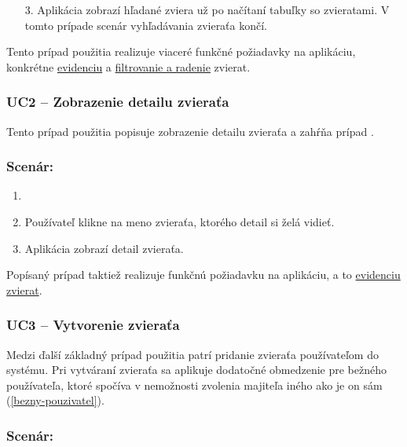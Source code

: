 \begin{enumerate}
    \item [3.] Aplikácia zobrazí hľadané zviera už po načítaní tabuľky so zvieratami. V tomto prípade scenár vyhľadávania zvieraťa končí.
\end{enumerate}

Tento prípad použitia realizuje viaceré funkčné požiadavky na aplikáciu, konkrétne \hyperref[evidencia-zvierat]{evidenciu} a \hyperref[filtrovanie-a-radenie]{filtrovanie a radenie} zvierat.

\subsubsection{UC2 -- Zobrazenie detailu zvieraťa}\label{uc2}

Tento prípad použitia popisuje zobrazenie detailu zvieraťa a zahŕňa prípad .

\subsubsection*{Scenár:}

\begin{enumerate}
	\item {}
	\item Používateľ klikne na meno zvieraťa, ktorého detail si želá vidieť.
	\item Aplikácia zobrazí detail zvieraťa.
\end{enumerate}

Popísaný prípad taktiež realizuje funkčnú požiadavku na aplikáciu, a to \hyperref[evidencia-zvierat]{evidenciu zvierat}.

\subsubsection{UC3 -- Vytvorenie zvieraťa}

Medzi ďalší základný prípad použitia patrí pridanie zvieraťa používateľom do systému.
Pri vytváraní zvieraťa sa aplikuje dodatočné obmedzenie pre bežného používateľa, ktoré spočíva v nemožnosti zvolenia majiteľa iného ako je on sám (\ref{bezny-pouzivatel}).

\subsubsection*{Scenár:}

